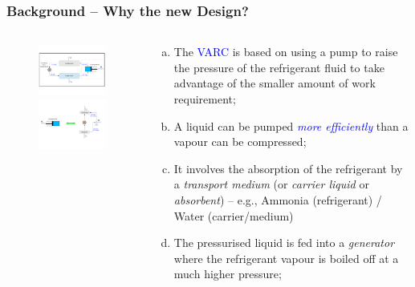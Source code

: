 \documentclass[10pt,compress]{beamer}
\begin{document}
\begin{frame}
 \frametitle{Background -- Why the new Design?}
  \begin{columns}
   \begin{column}[c]{0.45\linewidth}
    \begin{figure}%
     \vbox{
      \includegraphics[width=5.5cm,clip]{./Pics/Overview_Refrig31}
      \vspace{-.5cm}
      \includegraphics[width=5.5cm,clip]{./Pics/Overview_Refrig33}}
    \end{figure}  
   \end{column}  
   \begin{column}[c]{0.55\linewidth}
  \begin{enumerate}[(a)]
   \item <1-> The \textcolor{blue}{VARC} is based on using a pump to raise the pressure of the refrigerant fluid to take advantage of the smaller amount of work requirement;
   \item <2-> A liquid can be pumped \textcolor{blue}{\it more efficiently} than a vapour can be compressed;
   \item <3-> It involves the absorption of the refrigerant by a {\it transport medium} (or {\it carrier liquid} or {\it absorbent}) -- e.g., Ammonia (refrigerant) / Water (carrier/medium)
   \item <4-> The pressurised liquid is fed into a {\it generator} where the refrigerant vapour is boiled off at a much higher pressure;
  \end{enumerate}
   \end{column}  
 \end{columns}  
\end{frame}
\end{document}
